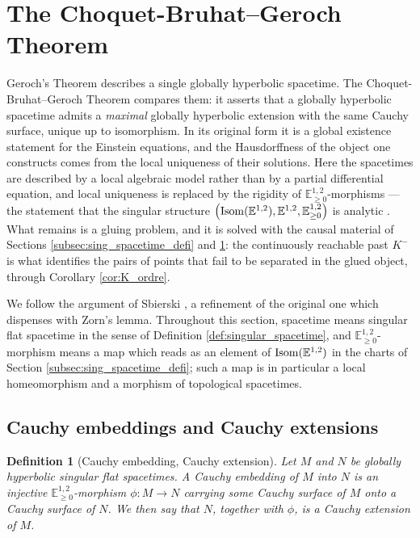 \documentclass[a4paper,twoside]{article}
\newcommand{\mass}[1]{\mathbb{E}^{1,2}_{#1}}
\newtheorem{defi}[lem]{Definition}
\begin{document}
\section{The Choquet-Bruhat--Geroch Theorem}\label{sec:CBG}

Geroch's Theorem describes a single globally hyperbolic spacetime. The Choquet-Bruhat--Geroch
Theorem \cite{MR0250640} compares them: it asserts that a globally hyperbolic spacetime admits a
\emph{maximal} globally hyperbolic extension with the same Cauchy surface, unique up to isomorphism.
In its original form it is a global existence statement for the Einstein equations, and the
Hausdorffness of the object one constructs comes from the local uniqueness of their solutions. Here
the spacetimes are described by a local algebraic model rather than by a partial differential
equation, and local uniqueness is replaced by the rigidity of $\mass{\geq0}$-morphisms --- the
statement that the singular structure $\left(\isom(\mass{}),\mass{},\mass{\geq0}\right)$ is analytic
\cite[Section~2.3]{thesis}. What remains is a gluing problem, and it is solved with the causal
material of Sections \ref{subsec:sing_spacetime_defi} and \ref{sec:CBG}: the continuously reachable
past $K^-$ is what identifies the pairs of points that fail to be separated in the glued object,
through Corollary \ref{cor:K_ordre}.

We follow the argument of Sbierski \cite{sbierski_geroch}, a refinement of the original one which
dispenses with Zorn's lemma. Throughout this section, spacetime means singular flat spacetime in the
sense of Definition \ref{def:singular_spacetime}, and $\mass{\geq0}$-morphism means a map which reads
as an element of $\isom(\mass{})$ in the charts of Section \ref{subsec:sing_spacetime_defi}; such a
map is in particular a local homeomorphism and a morphism of topological spacetimes.

\subsection{Cauchy embeddings and Cauchy extensions}

\begin{defi}[Cauchy embedding, Cauchy extension]\label{def:cauchy_embedding_cauchy_extension}
Let $M$ and $N$ be globally hyperbolic singular flat spacetimes. A \emph{Cauchy embedding} of $M$
into $N$ is an injective $\mass{\geq0}$-morphism $\phi:M\rightarrow N$ carrying some Cauchy surface
of $M$ onto a Cauchy surface of $N$. We then say that $N$, together with $\phi$, is a \emph{Cauchy
extension} of $M$.
\end{defi}
\end{document}
